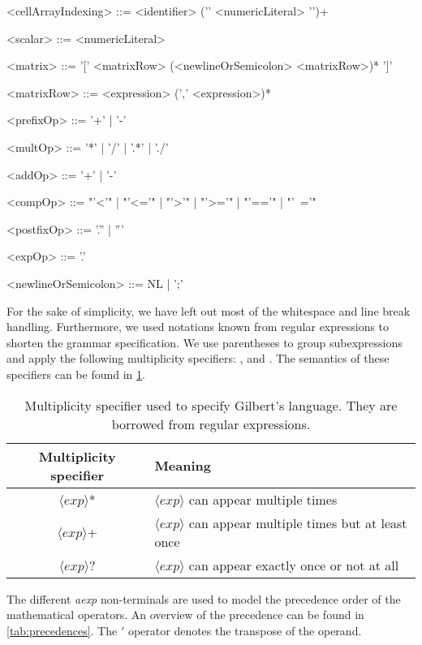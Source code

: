 \begin{grammar}
<cellArrayIndexing> ::= <identifier> ('{' <numericLiteral> '}')+

<scalar> ::= <numericLiteral>

<matrix> ::= '[' <matrixRow> (<newlineOrSemicolon> <matrixRow>)* ']'

<matrixRow> ::= <expression> (',' <expression>)*

<prefixOp> ::= '+' | '-'

<multOp> ::= '*' | '/' | '.*' | './'

<addOp> ::= '+' | '-'

<compOp> ::= "'<'" | "'<='" | "'>'" | "'>='" | "'=='" | "'~='"

<postfixOp> ::= '.'' | '''

<expOp> ::= '.'

<newlineOrSemicolon> ::= NL | ';'

\end{grammar}

For the sake of simplicity, we have left out most of the whitespace and line break handling.
Furthermore, we used notations known from regular expressions to shorten the grammar specification.
We use parentheses to group subexpressions and apply the following multiplicity specifiers: \code{*}, \code{+} and .
The semantics of these specifiers can be found in \cref{tab:multiplicity}.

\begin{table}
	\centering
	\begin{tabular}{c|l}
	Multiplicity specifier & Meaning\\
	\hline
	$\langle exp \rangle$* & $\langle exp\rangle$ can appear multiple times \\
	$\langle exp\rangle$+ & $\langle exp\rangle$ can appear multiple times but at least once \\
	$\langle exp\rangle$? & $\langle exp\rangle$ can appear exactly once or not at all
	\end{tabular}
	\caption{Multiplicity specifier used to specify Gilbert's language. They are borrowed from regular expressions.}
	\label{tab:multiplicity}
\end{table}

The different \emph{aexp} non-terminals are used to model the precedence order of the mathematical operators.
An overview of the precedence can be found in \cref{tab:precedences}.
The $'$ operator denotes the transpose of the operand.

